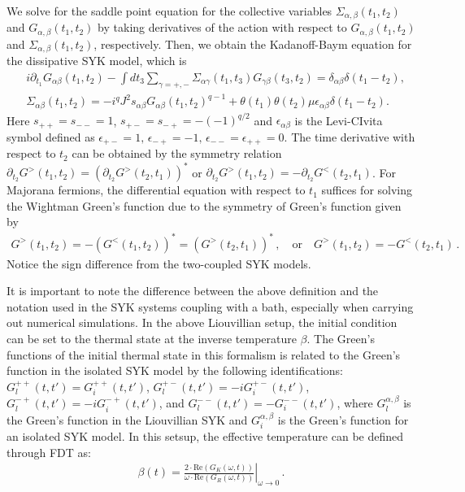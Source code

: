 We solve for the saddle point equation for the collective variables $\Sigma_{\alpha,\beta}(t_1,t_2)$ and $G_{\alpha,\beta}(t_1,t_2)$ by taking derivatives of the action with respect to $G_{\alpha,\beta}(t_1,t_2)$ and $\Sigma_{\alpha,\beta}(t_1,t_2)$, respectively. Then, we obtain the Kadanoff-Baym equation for the dissipative SYK model, which is
\begin{equation}
    \begin{split}
       &i\partial_{t_1} G_{\alpha \beta}(t_1,t_2) - \int dt_3 \sum_{\gamma = +, -}\Sigma_{\alpha\gamma}(t_1,t_3) G_{\gamma \beta}(t_3,t_2) = \delta _{\alpha\beta}\delta(t_1-t_2),\\
       &  \Sigma_{\alpha\beta}(t_1,t_2) = -i^{q}J^2 s_{\alpha\beta}G_{\alpha\beta}(t_1,t_2)^{q-1} + \theta(t_1)\theta(t_2)\mu\epsilon_{\alpha\beta} \delta(t_1-t_2).
\end{split}  \label{eq:KB Liouvill}
\end{equation}
Here $s_{++}=s_{--}=1$, $s_{+-}=s_{-+}=-(-1)^{q/2}$ and $\epsilon_{\alpha \beta}$ is the Levi-CIvita symbol defined as $\epsilon_{+-}=1,\,\epsilon_{-+}=-1,\, \epsilon_{--}=\epsilon_{++}=0$. The time derivative with respect to $t_2$ can be obtained by the symmetry relation $\partial_{t_2}G^>(t_1,t_2)=\left(\partial_{t_2}G^>(t_2,t_1)\right)^*$ or $\partial_{t_2}G^>(t_1,t_2)=-\partial_{t_2}G^<(t_2,t_1)$. For Majorana fermions, the differential equation with respect to $t_1$ suffices for solving the Wightman Green's function due to the symmetry of Green's function given by
\begin{align}
    G^>(t_1,t_2)=-\left(G^<(t_1,t_2)\right)^*=\left(G^>(t_2,t_1)\right)^*\,, \quad \mathrm{or}\quad G^>(t_1,t_2)=-G^<(t_2,t_1)\,.
\end{align}
Notice the sign difference from the two-coupled SYK models.

It is important to note the difference between the above definition and the notation used in the SYK systems coupling with a bath, especially when carrying out numerical simulations. In the above Liouvillian setup, the initial condition can be set to the thermal state at the inverse temperature $\beta$. The Green's functions of the initial thermal state in this formalism is related to the Green's function in the isolated SYK model by the following identifications: 
$G_l^{++}(t,t')=G_i^{++}(t,t')$, $G_l^{+-}(t,t')=-i G_i^{+-}(t,t')$, $G_l^{-+}(t,t')=-i G_i^{-+}(t,t')$, and $G_l^{--}(t,t')=- G_i^{--}(t,t')$, where $G_l^{\alpha,\beta}$ is the Green's function in the Liouvillian SYK and $G_i^{\alpha,\beta}$ is the Green's function for an isolated SYK model.
In this setsup, the effective temperature can be defined through FDT as:
\begin{gather}
    \beta(t)=\left.\frac{2 \cdot \mathrm{Re}(G_{K}(\omega,t))}{\omega \cdot \mathrm{Re}(G_{R}(\omega,t))}\right|_{\omega\rightarrow 0}\,.
\end{gather}


